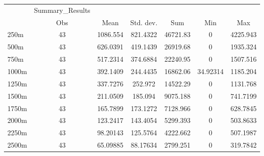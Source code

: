 \begin{tabular}{l*{6}{c}}
\hline\hline
            &Summary\_Results&            &            &            &            &            \\
            &         Obs&        Mean&   Std. dev.&         Sum&         Min&         Max\\
\hline
250m        &          43&    1086.554&    821.4322&    46721.83&           0&    4225.943\\
500m        &          43&    626.0391&    419.1439&    26919.68&           0&    1935.324\\
750m        &          43&    517.2314&    374.6884&    22240.95&           0&    1507.516\\
1000m       &          43&    392.1409&    244.4435&    16862.06&    34.92314&    1185.204\\
1250m       &          43&    337.7276&     252.972&    14522.29&           0&    1131.768\\
1500m       &          43&    211.0509&     185.094&    9075.188&           0&    741.7199\\
1750m       &          43&    165.7899&    173.1272&    7128.966&           0&    628.7845\\
2000m       &          43&    123.2417&    143.4054&    5299.393&           0&    503.8633\\
2250m       &          43&    98.20143&    125.5764&    4222.662&           0&    507.1987\\
2500m       &          43&    65.09885&    88.17634&    2799.251&           0&    319.7842\\
\hline\hline
\end{tabular}
